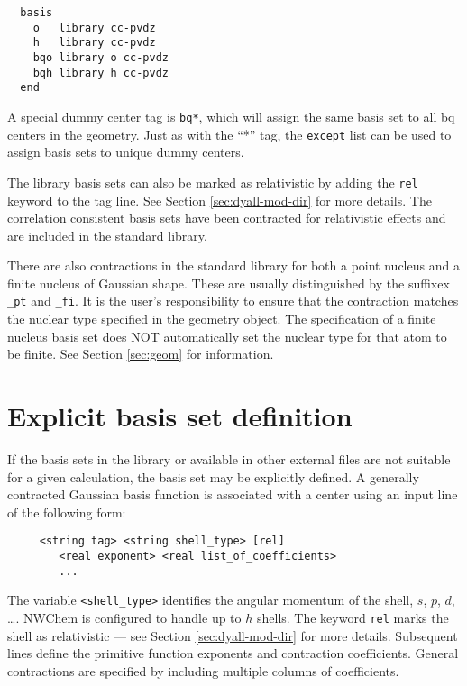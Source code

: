 \begin{verbatim}
  basis
    o   library cc-pvdz
    h   library cc-pvdz
    bqo library o cc-pvdz
    bqh library h cc-pvdz
  end
\end{verbatim}
A special dummy center tag is \verb+bq*+, which will assign the same basis 
set to all bq centers in the geometry. Just as with the ``*'' tag, the 
\verb+except+ list can be used to assign basis sets to unique dummy centers.

The library basis sets can also be marked as relativistic by adding the
\verb+rel+ keyword to the tag line. See Section \ref{sec:dyall-mod-dir} for
more details. The correlation consistent basis sets have been contracted for
relativistic effects and are included in the standard library.

There are also contractions in the standard library for both a point nucleus
and a finite nucleus of Gaussian shape. These are usually distinguished by
the suffixex {\tt \_pt} and {\tt \_fi}. It is the user's responsibility to
ensure that the contraction matches the nuclear type specified in the
geometry object. The specification of a finite nucleus basis set does NOT
automatically set the nuclear type for that atom to be finite.  See 
Section \ref{sec:geom} for information.

\section{Explicit basis set definition}

If the basis sets in the library or available in other external files
are not suitable for a given calculation, 
the basis set may be explicitly defined.
A generally contracted Gaussian basis function is associated with a
center using an input line of the following form:
\begin{verbatim}
     <string tag> <string shell_type> [rel]
        <real exponent> <real list_of_coefficients>
        ...
\end{verbatim}

The variable \verb+<shell_type>+ identifies the angular momentum of the
shell, $s$, $p$, $d$, \ldots.  NWChem is configured to handle up to $h$
shells.  The keyword \verb+rel+ marks the shell as relativistic --- see
Section \ref{sec:dyall-mod-dir} for more details.  Subsequent lines define
the primitive function exponents and contraction coefficients.  General
contractions are specified by including multiple columns of coefficients.

